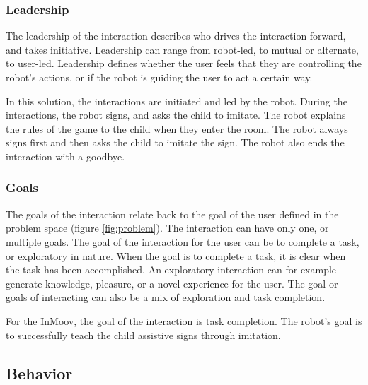 \subsubsection{Leadership}

The leadership of the interaction describes who drives the interaction forward, and takes initiative. Leadership can range from robot-led, to mutual or alternate, to user-led. Leadership defines whether the user feels that they are controlling the robot's actions, or if the robot is guiding the user to act a certain way.

In this solution, the interactions are initiated and led by the robot. During the interactions, the robot signs, and asks the child to imitate. The robot explains the rules of the game to the child when they enter the room. The robot always signs first and then asks the child to imitate the sign. The robot also ends the interaction with a goodbye. 


\subsubsection{Goals}

The goals of the interaction relate back to the goal of the user defined in the problem space (figure \ref{fig:problem}). The interaction can have only one, or multiple goals. The goal of the interaction for the user can be to complete a task, or exploratory in nature. When the goal is to complete a task, it is clear when the task has been accomplished. An exploratory interaction can for example generate knowledge, pleasure, or a novel experience for the user. The goal or goals of interacting can also be a mix of exploration and task completion.

For the InMoov, the goal of the interaction is task completion. The robot's goal is to successfully teach the child assistive signs through imitation.



\subsection{Behavior}

